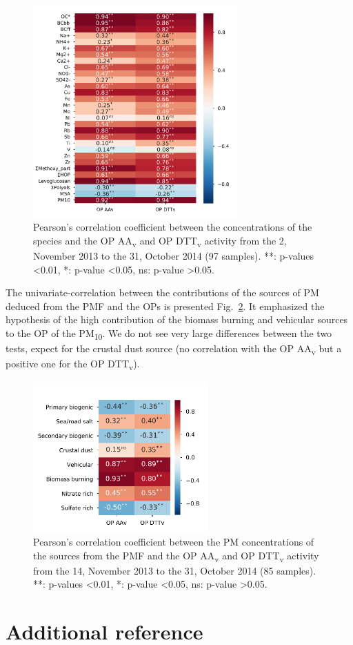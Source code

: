 \documentclass[]{article}
\begin{document}
\begin{figure}[h]
    \centering
    \includegraphics[width=0.7\textwidth]{figures/SI_fig02}
    \caption{Pearson's correlation coefficient between the concentrations of the
        species and the OP AA\textsubscript{v} and OP DTT\textsubscript{v}
        activity from the 2, November 2013 to the 31, October 2014 (97 samples).
        **: p-values \textless{}0.01, *: p-value \textless{}0.05, ns: p-value
    \textgreater{}0.05.}
    \label{fig:pearsonrChem}
\end{figure}

The univariate-correlation between the contributions of the sources of PM
deduced from the PMF and the OPs is presented Fig.~\ref{fig:pearsonrSrc}. It
emphasized the hypothesis of the high contribution of the biomass burning and
vehicular sources to the OP of the PM\textsubscript{10}. We do not see very
large differences between the two tests, expect for the crustal dust source (no
correlation with the OP AA\textsubscript{v} but a positive one for the OP
DTT\textsubscript{v}).

\begin{figure}[h]
    \centering
    \includegraphics[width=0.6\textwidth]{figures/SI_fig03}
    \caption{Pearson's correlation coefficient between the PM concentrations of
        the sources from the PMF and the OP AA\textsubscript{v} and OP
        DTT\textsubscript{v} activity from the 14, November 2013 to the 31,
        October 2014 (85 samples). **: p-values \textless{}0.01, *: p-value
    \textless{}0.05, ns: p-value \textgreater{}0.05.}
    \label{fig:pearsonrSrc}
\end{figure}
\clearpage

\section{Additional reference}\label{additional-reference}


\end{document}
